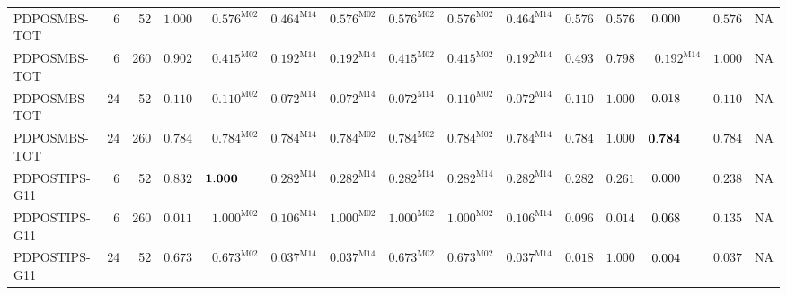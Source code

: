 \documentclass[10pt,a4paper]{article}
\begin{document}
\begin{longtable}{@{}lrrrrrrrrrrrrrr@{}}
PDPOSMBS-TOT & 6 & 52 & $\mathbf{1.000}$ & $\mathbf{0.576}^{\mathrm{M02}}$ & $\mathbf{0.464}^{\mathrm{M14}}$ & $\mathbf{0.576}^{\mathrm{M02}}$ & $\mathbf{0.576}^{\mathrm{M02}}$ & $\mathbf{0.576}^{\mathrm{M02}}$ & $\mathbf{0.464}^{\mathrm{M14}}$ & $\mathbf{0.576}$ & $\mathbf{0.576}$ & $0.000\hphantom{^{\mathrm{M00}}}$ & $\mathbf{0.576}$ & \textsc{NA} \\
PDPOSMBS-TOT & 6 & 260 & $\mathbf{0.902}$ & $\mathbf{0.415}^{\mathrm{M02}}$ & $\mathbf{0.192}^{\mathrm{M14}}$ & $\mathbf{0.192}^{\mathrm{M14}}$ & $\mathbf{0.415}^{\mathrm{M02}}$ & $\mathbf{0.415}^{\mathrm{M02}}$ & $\mathbf{0.192}^{\mathrm{M14}}$ & $\mathbf{0.493}$ & $\mathbf{0.798}$ & $\mathbf{0.192}^{\mathrm{M14}}$ & $\mathbf{1.000}$ & \textsc{NA} \\
PDPOSMBS-TOT & 24 & 52 & $\mathbf{0.110}$ & $\mathbf{0.110}^{\mathrm{M02}}$ & $0.072^{\mathrm{M14}}$ & $0.072^{\mathrm{M14}}$ & $0.072^{\mathrm{M14}}$ & $\mathbf{0.110}^{\mathrm{M02}}$ & $0.072^{\mathrm{M14}}$ & $\mathbf{0.110}$ & $\mathbf{1.000}$ & $0.018\hphantom{^{\mathrm{M00}}}$ & $\mathbf{0.110}$ & \textsc{NA} \\
PDPOSMBS-TOT & 24 & 260 & $\mathbf{0.784}$ & $\mathbf{0.784}^{\mathrm{M02}}$ & $\mathbf{0.784}^{\mathrm{M14}}$ & $\mathbf{0.784}^{\mathrm{M02}}$ & $\mathbf{0.784}^{\mathrm{M02}}$ & $\mathbf{0.784}^{\mathrm{M02}}$ & $\mathbf{0.784}^{\mathrm{M14}}$ & $\mathbf{0.784}$ & $\mathbf{1.000}$ & $\mathbf{0.784}\hphantom{^{\mathrm{M00}}}$ & $\mathbf{0.784}$ & \textsc{NA} \\
PDPOSTIPS-G11 & 6 & 52 & $\mathbf{0.832}$ & $\mathbf{1.000}\hphantom{^{\mathrm{M00}}}$ & $\mathbf{0.282}^{\mathrm{M14}}$ & $\mathbf{0.282}^{\mathrm{M14}}$ & $\mathbf{0.282}^{\mathrm{M14}}$ & $\mathbf{0.282}^{\mathrm{M14}}$ & $\mathbf{0.282}^{\mathrm{M14}}$ & $\mathbf{0.282}$ & $\mathbf{0.261}$ & $0.000\hphantom{^{\mathrm{M00}}}$ & $\mathbf{0.238}$ & \textsc{NA} \\
PDPOSTIPS-G11 & 6 & 260 & $0.011$ & $\mathbf{1.000}^{\mathrm{M02}}$ & $\mathbf{0.106}^{\mathrm{M14}}$ & $\mathbf{1.000}^{\mathrm{M02}}$ & $\mathbf{1.000}^{\mathrm{M02}}$ & $\mathbf{1.000}^{\mathrm{M02}}$ & $\mathbf{0.106}^{\mathrm{M14}}$ & $0.096$ & $0.014$ & $0.068\hphantom{^{\mathrm{M00}}}$ & $\mathbf{0.135}$ & \textsc{NA} \\
PDPOSTIPS-G11 & 24 & 52 & $\mathbf{0.673}$ & $\mathbf{0.673}^{\mathrm{M02}}$ & $0.037^{\mathrm{M14}}$ & $0.037^{\mathrm{M14}}$ & $\mathbf{0.673}^{\mathrm{M02}}$ & $\mathbf{0.673}^{\mathrm{M02}}$ & $0.037^{\mathrm{M14}}$ & $0.018$ & $\mathbf{1.000}$ & $0.004\hphantom{^{\mathrm{M00}}}$ & $0.037$ & \textsc{NA} \\

\end{longtable}
\end{document}
